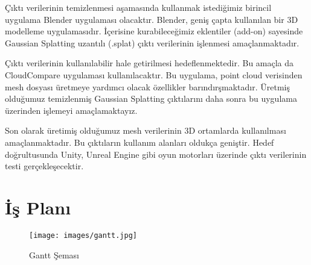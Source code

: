 \documentclass[12pt, a4paper]{article}
\begin{document}
	\bigskip
	
	Çıktı verilerinin temizlenmesi aşamasında kullanmak istediğimiz birincil uygulama Blender uygulaması olacaktır. Blender, geniş çapta kullanılan bir 3D modelleme uygulamasıdır. İçerisine kurabileceğimiz eklentiler (add-on) sayesinde Gaussian Splatting uzantılı (.splat) çıktı verilerinin işlenmesi amaçlanmaktadır.
	
	\bigskip
	
	Çıktı verilerinin kullanılabilir hale getirilmesi hedeflenmektedir. Bu amaçla da CloudCompare uygulaması kullanılacaktır. Bu uygulama, point cloud verisinden mesh dosyası üretmeye yardımcı olacak özellikler barındırşmaktadır. Üretmiş olduğumuz temizlenmiş Gaussian Splatting çıktılarını daha sonra bu uygulama üzerinden işlemeyi amaçlamaktayız.
	
	\bigskip
	
	Son olarak üretimiş olduğumuz mesh verilerinin 3D ortamlarda kullanılması amaçlanmaktadır. Bu çıktıların kullanım alanları oldukça geniştir. Hedef doğrultusunda Unity, Unreal Engine gibi oyun motorları üzerinde çıktı verilerinin testi gerçekleşecektir.
	
	
	
	
	
	
	
	 
	
	\section{İş Planı}
	\begin{figure}[h]	
		\centering
		\texttt{[image: images/gantt.jpg]}
		\label{Gantt Chart}
		\caption{Gantt Şeması}
	\end{figure}

	
\end{document}
